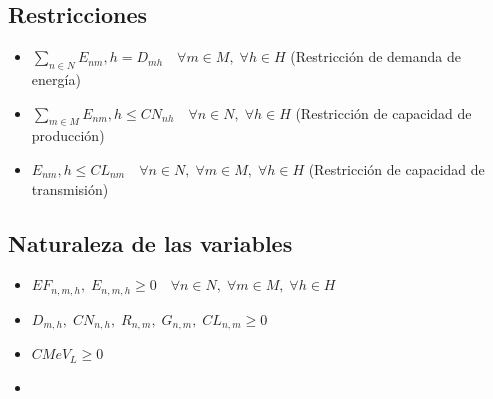 \documentclass[addpoints,10pt]{exam}
\begin{document}
\begin{flushleft}
		\subsection{Restricciones}
		\begin{itemize}
			\item $\sum\limits_{n \in N} E_{nm},h = D_{mh} \quad \forall m \in M, \; \forall h \in H$ (Restricción de demanda de energía)
			\item $\sum\limits_{m \in M} E_{nm},h \leq CN_{nh} \quad \forall n \in N, \; \forall h \in H$ (Restricción de capacidad de producción)
			\item $E_{nm},h \leq CL_{nm} \quad \forall n \in N, \; \forall m \in M, \; \forall h \in H$ (Restricción de capacidad de transmisión)
		\end{itemize}
		\subsection{Naturaleza de las variables}
		\begin{itemize}
			\item $EF_{n,m,h}, \; E_{n,m,h} \geq 0 \quad \forall n \in N, \; \forall m \in M, \; \forall h \in H$
			\item  $D_{m,h}, \; CN_{n,h}, \; R_{n,m}, \; G_{n,m}, \; CL_{n,m} \geq 0$
			\item  $CMeV_{L} \geq 0$
			\item 
		\end{itemize}
	
		
	\end{flushleft}
	
\end{document}
